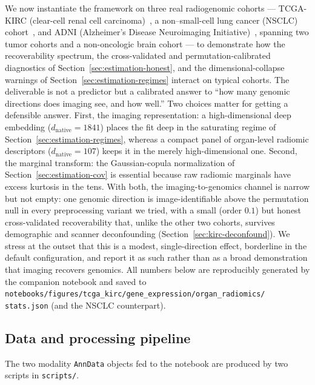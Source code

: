 \documentclass{article}
\begin{document}
We now instantiate the framework on three real radiogenomic cohorts ---
TCGA-KIRC (clear-cell renal cell carcinoma)~\citep{ricketts2018tcgakirc}, a
non--small-cell lung cancer (NSCLC) cohort~\citep{bakr2018nsclcradiogenomics},
and ADNI (Alzheimer's Disease Neuroimaging Initiative)~\citep{petersen2010adni},
spanning two tumor cohorts and a non-oncologic brain cohort
--- to demonstrate how the recoverability spectrum, the cross-validated and
permutation-calibrated diagnostics of Section~\ref{sec:estimation-honest}, and
the dimensional-collapse warnings of Section~\ref{sec:estimation-regimes}
interact on typical cohorts. The deliverable is not a predictor but a calibrated
answer to ``how many genomic directions does imaging see, and how well.'' Two
choices matter for getting a defensible answer. First, the imaging
representation: a high-dimensional deep embedding ($d_{\mathrm{native}}=1841$)
places the fit deep in the saturating regime of
Section~\ref{sec:estimation-regimes}, whereas a compact panel of organ-level
radiomic descriptors ($d_{\mathrm{native}}=107$) keeps it in the merely
high-dimensional one. Second, the marginal transform: the Gaussian-copula
normalization of Section~\ref{sec:estimation-cov} is essential because raw
radiomic marginals have excess kurtosis in the tens. With both, the
imaging-to-genomics channel is narrow but not empty: one genomic direction
is image-identifiable above the permutation null in every preprocessing
variant we tried, with a small (order $0.1$) but honest cross-validated
recoverability that, unlike the other two cohorts, survives demographic and
scanner deconfounding (Section~\ref{sec:kirc-deconfound}). We stress at the
outset that this is a modest, single-direction effect, borderline in the default
configuration, and report it as such rather than as a broad demonstration that
imaging recovers genomics. All
numbers below are reproducibly generated by the companion notebook and saved to
\texttt{notebooks/figures/tcga\_kirc/gene\_expression/organ\_radiomics/%
stats.json} (and the NSCLC counterpart).

\subsection{Data and processing pipeline}
\label{sec:kirc-pipeline}
The two modality \texttt{AnnData} objects fed to the notebook are produced by
two scripts in \texttt{scripts/}.
\end{document}
